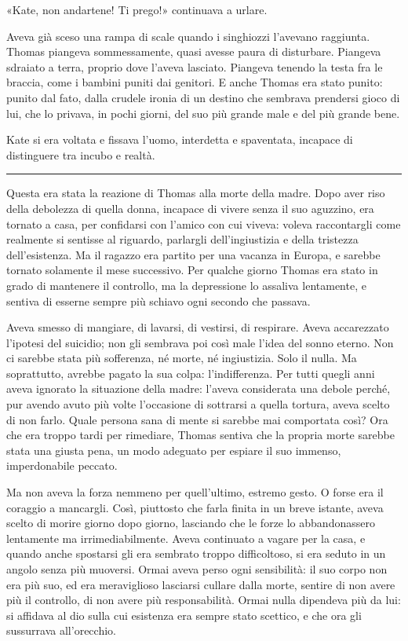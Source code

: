 \documentclass[a4paper,oneside,11pt]{memoir}
\begin{document}
«Kate, non andartene! Ti prego!» continuava a urlare.

Aveva già sceso una rampa di scale quando i singhiozzi l'avevano raggiunta.
Thomas piangeva sommessamente, quasi avesse paura di disturbare. Piangeva
sdraiato a terra, proprio dove l'aveva lasciato. Piangeva tenendo la testa fra
le braccia, come i bambini puniti dai genitori. E anche Thomas era stato punito:
punito dal fato, dalla crudele ironia di un destino che sembrava prendersi gioco
di lui, che lo privava, in pochi giorni, del suo più grande male e del più
grande bene.

Kate si era voltata e fissava l'uomo, interdetta e spaventata, incapace di
distinguere tra incubo e realtà.

\plainbreak{1}

Questa era stata la reazione di Thomas alla morte della madre. Dopo aver riso
della debolezza di quella donna, incapace di vivere senza il suo aguzzino, era
tornato a casa, per confidarsi con l'amico con cui viveva: voleva raccontargli
come realmente si sentisse al riguardo, parlargli dell'ingiustizia e della
tristezza dell'esistenza. Ma il ragazzo era partito per una vacanza in Europa, e
sarebbe tornato solamente il mese successivo. Per qualche giorno Thomas era
stato in grado di mantenere il controllo, ma la depressione lo assaliva
lentamente, e sentiva di esserne sempre più schiavo ogni secondo che passava.

Aveva smesso di mangiare, di lavarsi, di vestirsi, di respirare. Aveva
accarezzato l'ipotesi del suicidio; non gli sembrava poi così male l'idea del
sonno eterno. Non ci sarebbe stata più sofferenza, né morte, né ingiustizia.
Solo il nulla. Ma soprattutto, avrebbe pagato la sua colpa: l'indifferenza. Per
tutti quegli anni aveva ignorato la situazione della madre: l'aveva considerata
una debole perché, pur avendo avuto più volte l'occasione di sottrarsi a quella
tortura, aveva scelto di non farlo. Quale persona sana di mente si sarebbe mai
comportata così? Ora che era troppo tardi per rimediare, Thomas sentiva che la
propria morte sarebbe stata una giusta pena, un modo adeguato per espiare il suo
immenso, imperdonabile peccato.

Ma non aveva la forza nemmeno per quell'ultimo, estremo gesto. O forse era il
coraggio a mancargli. Così, piuttosto che farla finita in un breve istante,
aveva scelto di morire giorno dopo giorno, lasciando che le forze lo
abbandonassero lentamente ma irrimediabilmente. Aveva continuato a vagare per la
casa, e quando anche spostarsi gli era sembrato troppo difficoltoso, si era
seduto in un angolo senza più muoversi. Ormai aveva perso ogni sensibilità: il
suo corpo non era più suo, ed era meraviglioso lasciarsi cullare dalla morte,
sentire di non avere più il controllo, di non avere più responsabilità. Ormai
nulla dipendeva più da lui: si affidava al dio sulla cui esistenza era sempre
stato scettico, e che ora gli sussurrava all'orecchio.
\end{document}
